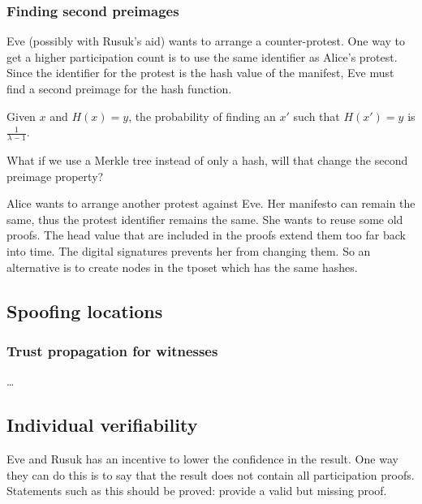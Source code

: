 \subsubsection{Finding second preimages}

Eve (possibly with Rusuk's aid) wants to arrange a counter-protest.
One way to get a higher participation count is to use the same identifier as 
Alice's protest.
Since the identifier for the protest is the hash value of the manifest, Eve 
must find a second preimage for the hash function.


\begin{proposition}
  Given \(x\) and \(H(x) = y\), the probability of finding an \(x'\) such that 
  \(H(x') = y\) is \(\frac{1}{\lambda-1}\).
\end{proposition}

\begin{question}
  What if we use a Merkle tree instead of only a hash, will that change the 
  second preimage property?
\end{question}

Alice wants to arrange another protest against Eve.
Her manifesto can remain the same, thus the protest identifier remains the 
same.
She wants to reuse some old proofs.
The head value that are included in the proofs extend them too far back into 
time.
The digital signatures prevents her from changing them.
So an alternative is to create nodes in the \ac{tposet} which has the same 
hashes.

\subsection{Spoofing locations}

\subsubsection{Trust propagation for witnesses}

\dots

\subsection{Individual verifiability}

Eve and Rusuk has an incentive to lower the confidence in the result.
One way they can do this is to say that the result does not contain all 
participation proofs.
Statements such as this should be proved: provide a valid but missing proof.
